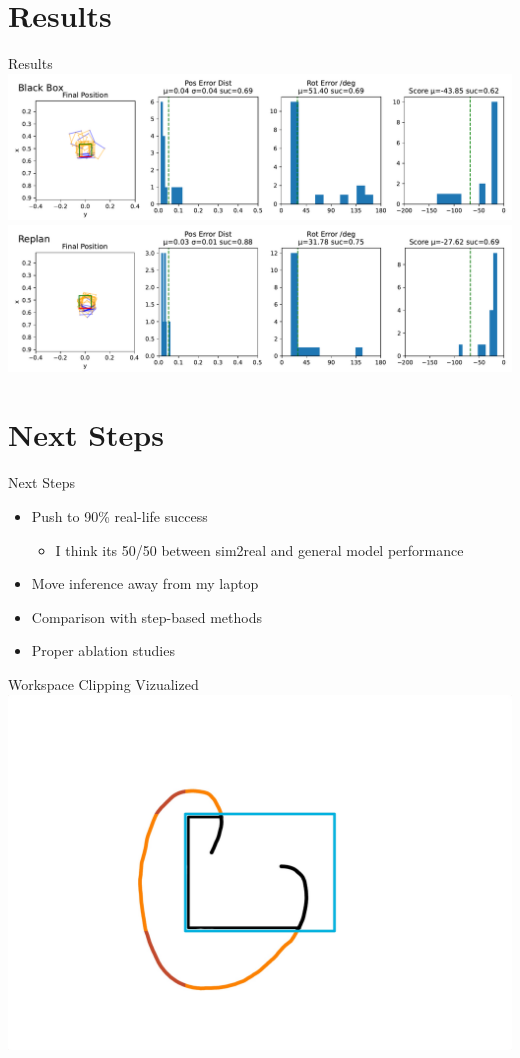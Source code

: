\documentclass[16:9,en,navbarinfooter]{sdqbeamer}
\begin{document}
\section{Results}
\begin{frame}{Results}
\center
    \includegraphics[width=.7\linewidth]{media/blackbox_presentation.pdf}\\
    \includegraphics[width=.7\linewidth]{media/replan_presentation.pdf}
\end{frame}

\section{Next Steps}
\begin{frame}{Next Steps}

    \begin{itemize}
        \item Push to 90\% real-life success 
        \begin{itemize}
                \item I think its 50/50 between sim2real and general model performance
        \end{itemize}
        \item Move inference away from my laptop 
        \item Comparison with step-based methods
        \item Proper ablation studies
    \end{itemize}
\end{frame}


\appendix
\beginbackup{}
\begin{frame}{Workspace Clipping Vizualized}
    \center
    \includegraphics[width=.7\linewidth]{media/workspace_clipping.pdf}
\end{frame}

\backupend{}
\end{document}
